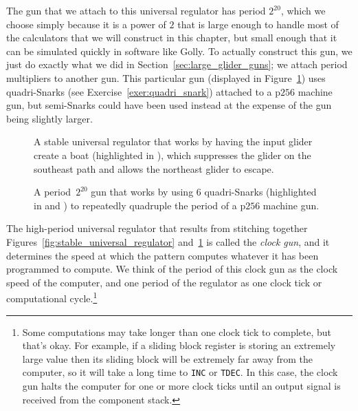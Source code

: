 The gun that we attach to this universal regulator has period $2^{20}$, which we choose simply because it is a power of $2$ that is large enough to handle most of the calculators that we will construct in this chapter, but small enough that it can be simulated quickly in software like Golly. To actually construct this gun, we just do exactly what we did in Section~\ref{sec:large_glider_guns}; we attach period multipliers to another gun. This particular gun (displayed in Figure~\ref{fig:p2to_the_20_gun}) uses quadri-Snarks (see Exercise~\ref{exer:quadri_snark})  attached to a p$256$ machine gun, but semi-Snarks could have been used instead at the expense of the gun being slightly larger.

\begin{figure}[!htb]
	\centering
	\begin{minipage}[t]{0.47\textwidth}
		\centering
		\caption{A stable universal regulator that works by having the input glider create a boat (highlighted in ), which suppresses the glider on the southeast path and allows the northeast glider to escape.}\label{fig:stable_universal_regulator}
	\end{minipage}\hfill
	\begin{minipage}[t]{0.49\textwidth}
		\centering
		\caption{A period~$2^{20}$ gun that works by using $6$ quadri-Snarks (highlighted in  and ) to repeatedly quadruple the period of a p$256$ machine gun.}\label{fig:p2to_the_20_gun}
	\end{minipage}
\end{figure}

The high-period universal regulator that results from stitching together Figures~\ref{fig:stable_universal_regulator} and~\ref{fig:p2to_the_20_gun} is called the \emph{clock gun}, and it determines the speed at which the pattern computes whatever it has been programmed to compute. We think of the period of this clock gun as the clock speed of the computer, and one period of the regulator as one clock tick or computational cycle.\footnote{Some computations may take longer than one clock tick to complete, but that's okay. For example, if a sliding block register is storing an extremely large value then its sliding block will be extremely far away from the computer, so it will take a long time to \texttt{INC} or \texttt{TDEC}. In this case, the clock gun halts the computer for one or more clock ticks until an output signal is received from the component stack.}

